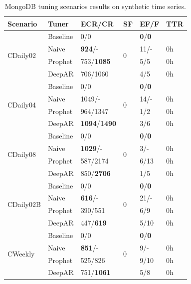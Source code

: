 \documentclass[a4paper, 12pt]{article} %
\newcommand{\ra}[1]{\renewcommand{\arraystretch}{#1}}
\begin{document}
	\begin{table}\centering 
		\ra{1.3}
		\begin{tabularx}{\textwidth}{@{}XXXXXX@{}}
			\toprule
			Scenario & Tuner & ECR/CR & SF & EF/F & TTR\\
			
			\midrule
			\multirow{4}{*}{CDaily02}
			& Baseline & 0/0 & \multirow{4}{*}{0}  & \textbf{0}/\textbf{0} & \\
			& Naive & \textbf{924}/- && 11/- & 0h \\
			& Prophet & 753/\textbf{1085} && 5/5 & 0h \\
			& DeepAR & 706/1060 && 4/5 & 0h \\
			
			
			\midrule
			\multirow{4}{*}{CDaily04}
			& Baseline & 0/0 & \multirow{4}{*}{0}  & \textbf{0}/\textbf{0} & \\
			& Naive & 1049/- && 14/- & 0h \\
			& Prophet & 964/1347 && 1/2 & 0h\\
			& DeepAR & \textbf{1094}/\textbf{1490} && 3/6 & 0h \\
			
			\midrule
			\multirow{4}{*}{CDaily08}
			& Baseline & 0/0 & \multirow{4}{*}{0}  & \textbf{0}/\textbf{0} & \\
			& Naive & \textbf{1029}/- && 3/- & 0h \\
			& Prophet & 587/2174 && 6/13 & 0h \\
			& DeepAR & 850/\textbf{2706} && 1/5 & 0h \\
			
			\midrule
			\multirow{4}{*}{CDaily02B}
			& Baseline & 0/0 & \multirow{4}{*}{0}  & \textbf{0}/\textbf{0} & \\
			& Naive & \textbf{616}/- && 21/- & 0h \\
			& Prophet & 390/551 && 6/9 & 0h \\
			& DeepAR & 447/\textbf{619} &&5/10 & 0h \\
			
			\midrule
			\multirow{4}{*}{CWeekly}
			& Baseline & 0/0 & \multirow{4}{*}{0}  & \textbf{0}/\textbf{0} & \\
			& Naive & \textbf{851}/- && 9/- & 0h \\
			& Prophet & 525/826 && 9/10 & 0h \\
			& DeepAR & 751/\textbf{1061} && 5/8 & 0h \\
			
			\bottomrule
		\end{tabularx}
		\caption{MongoDB tuning scenarios results on synthetic time series. } \label{table:results_cassandra_synthetic}
	\end{table}
\end{document}
